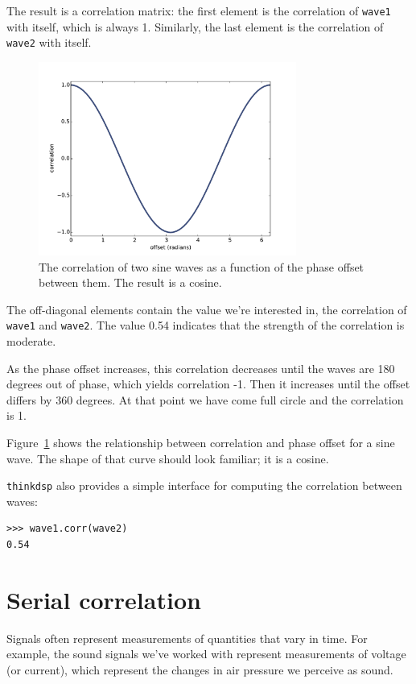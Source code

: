 \documentclass[12pt]{book}
\begin{document}
The result is a correlation matrix:
the first element is the correlation of {\tt wave1}
with itself, which is always 1.  Similarly, the last element
is the correlation of {\tt wave2} with itself.

\begin{figure}
\centerline{\includegraphics[height=2.5in]{figs/autocorr2.pdf}}
\caption{The correlation of two sine waves as a function of the
phase offset between them.  The result is a cosine.}
\label{fig.autocorr2}
\end{figure}

The off-diagonal elements contain the value we're interested in,
the correlation of {\tt wave1} and {\tt wave2}.  The value 0.54
indicates that the strength of the correlation is moderate.

As the phase offset increases, this correlation decreases until
the waves are 180 degrees out of phase, which yields correlation
-1.  Then it increases until the offset differs by 360 degrees.
At that point we have come full circle and the correlation is 1.

Figure~\ref{fig.autocorr2} shows the relationship between correlation and
phase offset for a sine wave.  The shape of that curve should look
familiar; it is a cosine.  

{\tt thinkdsp} also provides a simple interface for computing the
correlation between waves:

\begin{verbatim}
>>> wave1.corr(wave2)
0.54
\end{verbatim}


\section{Serial correlation}

Signals often represent measurements of quantities that vary in
time.  For example, the sound signals we've worked with represent
measurements of voltage (or current), which represent the changes
in air pressure we perceive as sound.
\end{document}
